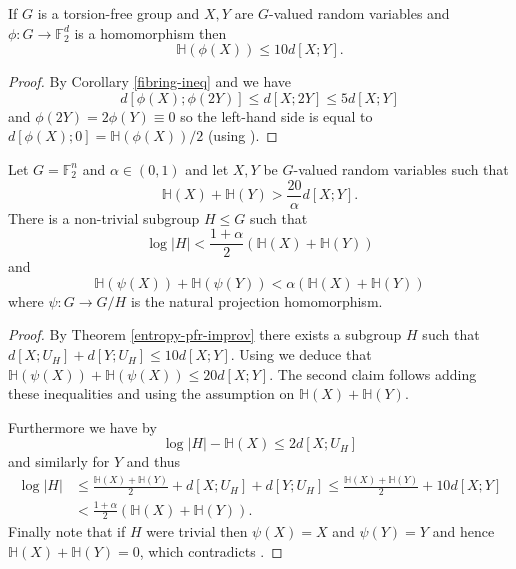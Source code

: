 \begin{lemma}\label{torsion-dist-shrinking}\leanok
If $G$ is a torsion-free group and $X,Y$ are $G$-valued random variables and $\phi:G\to \mathbb{F}_2^d$ is a homomorphism then
\[\mathbb{H}(\phi(X))\leq 10d[X;Y].\]
\end{lemma}
\begin{proof}
\leanok
By Corollary \ref{fibring-ineq} and  we have
\[d[\phi(X);\phi(2Y)]\leq d[X;2Y]\leq 5d[X;Y]\]
and $\phi(2Y)=2\phi(Y)\equiv 0$ so the left-hand side is equal to $d[\phi(X);0]=\mathbb{H}(\phi(X))/2$ (using ).
\end{proof}

\begin{lemma}\label{app-ent-pfr}\leanok
Let $G=\mathbb{F}_2^n$ and $\alpha\in (0,1)$ and let $X,Y$ be $G$-valued
random variables such that
\[\mathbb{H}(X)+\mathbb{H}(Y)> \frac{20}{\alpha} d[X;Y].\]
There is a non-trivial subgroup $H\leq G$ such that
\[\log \lvert H\rvert <\frac{1+\alpha}{2}(\mathbb{H}(X)+\mathbb{H}(Y))\] and
\[\mathbb{H}(\psi(X))+\mathbb{H}(\psi(Y))< \alpha (\mathbb{H}(X)+\mathbb{H}(Y))\]
where $\psi:G\to G/H$ is the natural projection homomorphism.
\end{lemma}
\begin{proof}
\leanok
By Theorem \ref{entropy-pfr-improv} there exists a subgroup $H$ such that
$d[X;U_H] + d[Y;U_H] \leq 10 d[X;Y]$. Using  we
deduce that $\mathbb{H}(\psi(X)) + \mathbb{H}(\psi(X)) \leq 20 d[X;Y]$. The
second claim follows adding these inequalities and using the assumption on
$\mathbb{H}(X)+\mathbb{H}(Y)$.

Furthermore we have by 
\[\log \lvert H \rvert-\mathbb{H}(X)\leq 2d[X;U_H]\]
and similarly for $Y$ and thus
\begin{align*}
\log \lvert  H\rvert
&\leq
\frac{\mathbb{H}(X)+\mathbb{H}(Y)}{2}+d[X;U_H] + d[Y;U_H] \leq
\frac{\mathbb{H}(X)+\mathbb{H}(Y)}{2}+ 10d[X;Y]
\\& <
\frac{1+\alpha}{2}(\mathbb{H}(X)+\mathbb{H}(Y)).
\end{align*}
Finally note that if $H$
were trivial then $\psi(X)=X$ and $\psi(Y)=Y$ and hence
$\mathbb{H}(X)+\mathbb{H}(Y)=0$, which contradicts .
\end{proof}


